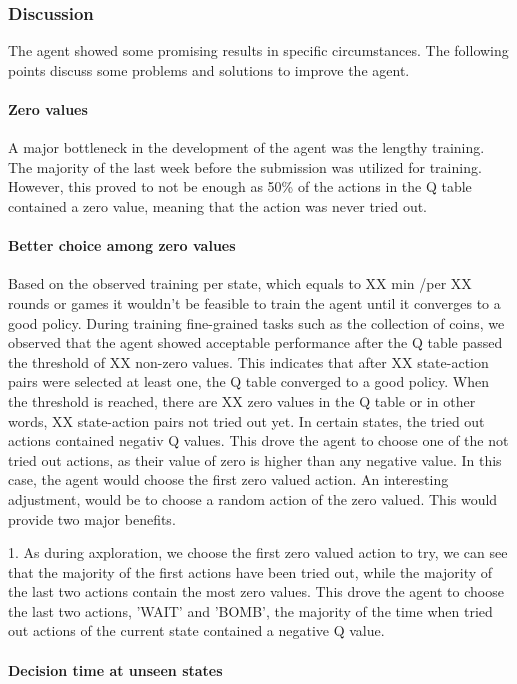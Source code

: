 \documentclass[
	letterpaper, %
	12pt, %
]{CSUniSchoolLabReport}
\begin{document}
\subsubsection{Discussion}
The agent showed some promising results in specific circumstances. The following points discuss
some problems and solutions to improve the agent.

\paragraph*{Zero values}
A major bottleneck in the development of the agent was the lengthy training. The majority of
the last week before the submission was utilized for training. However, this proved to not be enough as 50\%
of the actions in the Q table contained a zero value, meaning that the action was never tried out.

\paragraph*{Better choice among zero values}
Based on the observed training per state, which equals to XX min /per XX rounds or games it wouldn't
be feasible to train the agent until it converges to a good policy. During training fine-grained
tasks such as the collection of coins, we observed that the agent showed acceptable performance
after the Q table passed the threshold of XX non-zero values. This indicates that after XX state-action pairs
were selected at least one, the Q table converged to a good policy.
When the threshold is reached, there are XX zero values in the Q table or in other words, XX state-action pairs not
tried out yet. In certain states, the tried out actions contained negativ Q values. This drove the agent to
choose one of the not tried out actions, as their value of zero is higher than any negative value.
In this case, the agent would choose the first zero valued action. An interesting adjustment, would
be to choose a random action of the zero valued. This would provide two major benefits.

1. As during axploration, we choose the first zero valued action to try, we can see that the
majority of the first actions have been tried out, while the majority of the last two actions contain the most zero values.
This drove the agent to choose the last two actions, 'WAIT' and 'BOMB', the majority of the time
when tried out actions of the current state contained a negative Q value.

\paragraph*{Decision time at unseen states}
\end{document}
